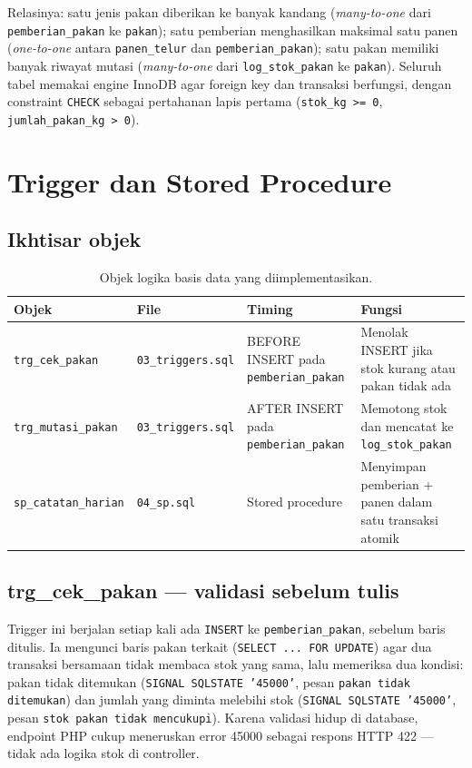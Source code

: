 \documentclass[12pt,a4paper]{article}
\begin{document}
Relasinya: satu jenis pakan diberikan ke banyak kandang (\textit{many-to-one} dari \texttt{pemberian\_pakan} ke \texttt{pakan}); satu pemberian menghasilkan maksimal satu panen (\textit{one-to-one} antara \texttt{panen\_telur} dan \texttt{pemberian\_pakan}); satu pakan memiliki banyak riwayat mutasi (\textit{many-to-one} dari \texttt{log\_stok\_pakan} ke \texttt{pakan}). Seluruh tabel memakai engine InnoDB agar foreign key dan transaksi berfungsi, dengan constraint \texttt{CHECK} sebagai pertahanan lapis pertama (\texttt{stok\_kg >= 0}, \texttt{jumlah\_pakan\_kg > 0}).

\section{Trigger dan Stored Procedure}

\subsection{Ikhtisar objek}

\begin{table}[h]
\centering
\caption{Objek logika basis data yang diimplementasikan.}
\begin{tabular}{p{3.2cm} p{2.6cm} p{3.2cm} p{4.2cm}}
\toprule
\textbf{Objek} & \textbf{File} & \textbf{Timing} & \textbf{Fungsi} \\
\midrule
\texttt{trg\_cek\_pakan} & \texttt{03\_triggers.sql} & BEFORE INSERT pada \texttt{pemberian\_pakan} & Menolak INSERT jika stok kurang atau pakan tidak ada \\
\texttt{trg\_mutasi\_pakan} & \texttt{03\_triggers.sql} & AFTER INSERT pada \texttt{pemberian\_pakan} & Memotong stok dan mencatat ke \texttt{log\_stok\_pakan} \\
\texttt{sp\_catatan\_harian} & \texttt{04\_sp.sql} & Stored procedure & Menyimpan pemberian + panen dalam satu transaksi atomik \\
\bottomrule
\end{tabular}
\end{table}

\subsection{trg\_cek\_pakan --- validasi sebelum tulis}

Trigger ini berjalan setiap kali ada \texttt{INSERT} ke \texttt{pemberian\_pakan}, sebelum baris ditulis. Ia mengunci baris pakan terkait (\texttt{SELECT ... FOR UPDATE}) agar dua transaksi bersamaan tidak membaca stok yang sama, lalu memeriksa dua kondisi: pakan tidak ditemukan (\texttt{SIGNAL SQLSTATE '45000'}, pesan \texttt{pakan tidak ditemukan}) dan jumlah yang diminta melebihi stok (\texttt{SIGNAL SQLSTATE '45000'}, pesan \texttt{stok pakan tidak mencukupi}). Karena validasi hidup di database, endpoint PHP cukup meneruskan error 45000 sebagai respons HTTP 422 --- tidak ada logika stok di controller.
\end{document}
